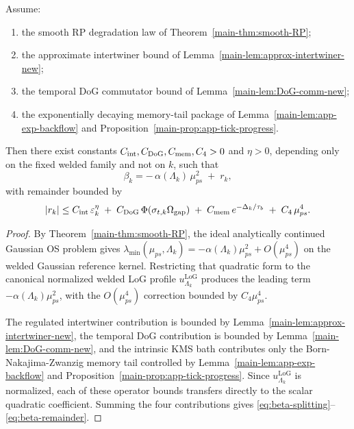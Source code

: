 \documentclass[11pt]{article}
\begin{document}
\begin{proposition}
\label{prop:compressed-beta-estimate}
Assume:
\begin{enumerate}[leftmargin=2em]
\item the smooth RP degradation law of Theorem~\ref{main-thm:smooth-RP};
\item the approximate intertwiner bound of Lemma~\ref{main-lem:approx-intertwiner-new};
\item the temporal DoG commutator bound of Lemma~\ref{main-lem:DoG-comm-new};
\item the exponentially decaying memory-tail package of
  Lemma~\ref{main-lem:app-exp-backflow} and Proposition~\ref{main-prop:app-tick-progress}.
\end{enumerate}
Then there exist constants \(C_{\rm int},C_{\rm DoG},C_{\rm mem},C_4>0\) and \(\eta>0\), depending only on the
fixed welded family and not on \(k\), such that
\begin{equation}
\beta_k
=
-\,\alpha(\Lambda_k)\,\mu_{ps}^2
\;+\;
r_k,
\label{eq:beta-splitting}
\end{equation}
with remainder bounded by
\begin{equation}
|r_k|
\le
C_{\rm int}\,\varepsilon_k^{\eta}
\;+\;
C_{\rm DoG}\,\Phi(\sigma_{t,k}\Omega_{\rm gap})
\;+\;
C_{\rm mem}\,e^{-\Delta_k/\tau_b}
\;+\;
C_4\,\mu_{ps}^4.
\label{eq:beta-remainder}
\end{equation}
\end{proposition}

\begin{proof}
By Theorem~\ref{main-thm:smooth-RP}, the ideal analytically continued Gaussian OS problem gives
\(
\lambda_{\min}(\mu_{ps},\Lambda_k)
=
-\alpha(\Lambda_k)\mu_{ps}^2+O(\mu_{ps}^4)
\)
on the welded Gaussian reference kernel. Restricting that quadratic form to the canonical normalized
welded LoG profile \(u^{\mathrm{LoG}}_{\Lambda_k}\) produces the leading term
\(-\alpha(\Lambda_k)\mu_{ps}^2\), with the \(O(\mu_{ps}^4)\) correction bounded by
\(C_4\mu_{ps}^4\).

The regulated intertwiner contribution is bounded by
Lemma~\ref{main-lem:approx-intertwiner-new}, the temporal DoG contribution is bounded by
Lemma~\ref{main-lem:DoG-comm-new}, and the intrinsic KMS bath contributes only the
Born-Nakajima-Zwanzig memory tail controlled by Lemma~\ref{main-lem:app-exp-backflow} and
Proposition~\ref{main-prop:app-tick-progress}. Since \(u^{\mathrm{LoG}}_{\Lambda_k}\) is
normalized, each of these operator bounds transfers directly to the scalar quadratic coefficient.
Summing the four contributions gives \eqref{eq:beta-splitting}--\eqref{eq:beta-remainder}.
\end{proof}
\end{document}
